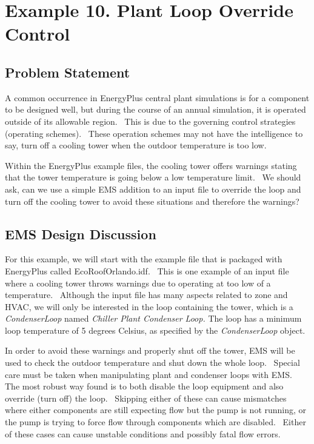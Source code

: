 \section{Example 10. Plant Loop Override Control}\label{example-10.-plant-loop-override-control}

\subsection{Problem Statement}\label{problem-statement-000}

A common occurrence in EnergyPlus central plant simulations is for a component to be designed well, but during the course of an annual simulation, it is operated outside of its allowable region.~ This is due to the governing control strategies (operating schemes).~ These operation schemes may not have the intelligence to say, turn off a cooling tower when the outdoor temperature is too low.

Within the EnergyPlus example files, the cooling tower offers warnings stating that the tower temperature is going below a low temperature limit.~ We should ask, can we use a simple EMS addition to an input file to override the loop and turn off the cooling tower to avoid these situations and therefore the warnings?

\subsection{EMS Design Discussion}\label{ems-design-discussion-000}

For this example, we will start with the example file that is packaged with EnergyPlus called EcoRoofOrlando.idf.~ This is one example of an input file where a cooling tower throws warnings due to operating at too low of a temperature.~ Although the input file has many aspects related to zone and HVAC, we will only be interested in the loop containing the tower, which is a \emph{CondenserLoop} named \emph{Chiller Plant Condenser Loop.} The loop has a minimum loop temperature of 5 degrees Celsius, as specified by the \emph{CondenserLoop} object.

In order to avoid these warnings and properly shut off the tower, EMS will be used to check the outdoor temperature and shut down the whole loop.~ Special care must be taken when manipulating plant and condenser loops with EMS.~ The most robust way found is to both disable the loop equipment and also override (turn off) the loop.~ Skipping either of these can cause mismatches where either components are still expecting flow but the pump is not running, or the pump is trying to force flow through components which are disabled.~ Either of these cases can cause unstable conditions and possibly fatal flow errors.

